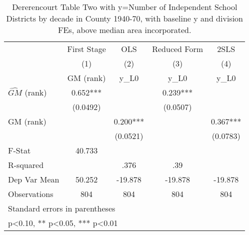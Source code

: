 \begin{table}[htbp]\centering
\def\sym#1{\ifmmode^{#1}\else\(^{#1}\)\fi}
\caption{Dererencourt Table Two with y=Number of Independent School Districts by decade in County 1940-70, with baseline y and division FEs, above median area incorporated.}
\begin{tabular}{l*{4}{c}}
\toprule
                    & First Stage   &         OLS   &Reduced Form   &        2SLS   \\
                    &\multicolumn{1}{c}{(1)}&\multicolumn{1}{c}{(2)}&\multicolumn{1}{c}{(3)}&\multicolumn{1}{c}{(4)}\\
                    &\multicolumn{1}{c}{GM  (rank)}&\multicolumn{1}{c}{y\_L0}&\multicolumn{1}{c}{y\_L0}&\multicolumn{1}{c}{y\_L0}\\
\midrule
$\hat{GM}$ (rank)   &       0.652***&               &       0.239***&               \\
                    &    (0.0492)   &               &    (0.0507)   &               \\
\addlinespace
GM  (rank)          &               &       0.200***&               &       0.367***\\
                    &               &    (0.0521)   &               &    (0.0783)   \\
\midrule
F-Stat              &      40.733   &               &               &               \\
R-squared           &               &        .376   &         .39   &               \\
Dep Var Mean        &      50.252   &     -19.878   &     -19.878   &     -19.878   \\
Observations        &         804   &         804   &         804   &         804   \\
\bottomrule
\multicolumn{5}{l}{\footnotesize Standard errors in parentheses}\\
\multicolumn{5}{l}{\footnotesize * p<0.10, ** p<0.05, *** p<0.01}\\
\end{tabular}
\end{table}
